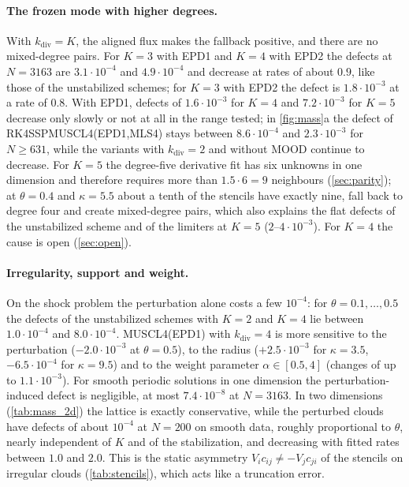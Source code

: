 \documentclass[11pt,a4paper]{article}
\numberwithin{equation}{section}
\begin{document}
\paragraph{The frozen mode with higher degrees.} With $k_{\mathrm{div}}=K$, the aligned flux makes the fallback positive, and there are no mixed-degree pairs. For $K=3$ with EPD1 and $K=4$ with EPD2 the defects at $N=3163$ are $3.1\cdot10^{-4}$ and $4.9\cdot10^{-4}$ and decrease at rates of about $0.9$, like those of the unstabilized schemes; for $K=3$ with EPD2 the defect is $1.8\cdot10^{-3}$ at a rate of $0.8$. With EPD1, defects of $1.6\cdot10^{-3}$ for $K=4$ and $7.2\cdot10^{-3}$ for $K=5$ decrease only slowly or not at all in the range tested; in \cref{fig:mass}a the defect of RK4SSPMUSCL4(EPD1,MLS4) stays between $8.6\cdot10^{-4}$ and $2.3\cdot10^{-3}$ for $N\ge631$, while the variants with $k_{\mathrm{div}}=2$ and without MOOD continue to decrease. For $K=5$ the degree-five derivative fit has six unknowns in one dimension and therefore requires more than $1.5\cdot6=9$ neighbours (\cref{sec:parity}); at $\theta=0.4$ and $\kappa=5.5$ about a tenth of the stencils have exactly nine, fall back to degree four and create mixed-degree pairs, which also explains the flat defects of the unstabilized scheme and of the limiters at $K=5$ ($2$--$4\cdot10^{-3}$). For $K=4$ the cause is open (\cref{sec:open}).

\paragraph{Irregularity, support and weight.} On the shock problem the perturbation alone costs a few $10^{-4}$: for $\theta=0.1,\dots,0.5$ the defects of the unstabilized schemes with $K=2$ and $K=4$ lie between $1.0\cdot10^{-4}$ and $8.0\cdot10^{-4}$. MUSCL4(EPD1) with $k_{\mathrm{div}}=4$ is more sensitive to the perturbation ($-2.0\cdot10^{-3}$ at $\theta=0.5$), to the radius ($+2.5\cdot10^{-3}$ for $\kappa=3.5$, $-6.5\cdot10^{-4}$ for $\kappa=9.5$) and to the weight parameter $\alpha\in[0.5,4]$ (changes of up to $1.1\cdot10^{-3}$). For smooth periodic solutions in one dimension the perturbation-induced defect is negligible, at most $7.4\cdot10^{-8}$ at $N=3163$. In two dimensions (\cref{tab:mass_2d}) the lattice is exactly conservative, while the perturbed clouds have defects of about $10^{-4}$ at $N=200$ on smooth data, roughly proportional to $\theta$, nearly independent of $K$ and of the stabilization, and decreasing with fitted rates between $1.0$ and $2.0$. This is the static asymmetry $V_ic_{ij}\ne-V_jc_{ji}$ of the stencils on irregular clouds (\cref{tab:stencils}), which acts like a truncation error.
\end{document}

